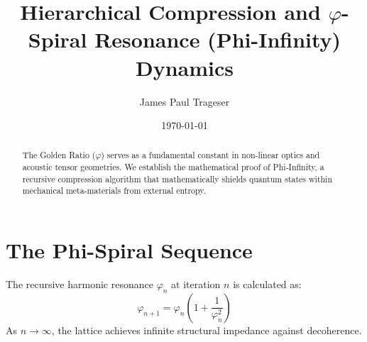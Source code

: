 \documentclass[reprint,aps,prl,twocolumn,superscriptaddress,amsmath,amssymb]{revtex4-2}
\begin{document}
\title{Hierarchical Compression and $\varphi$-Spiral Resonance (Phi-Infinity) Dynamics}

\author{James Paul Trageser}

\date{\today}

\begin{abstract}
The Golden Ratio ($\varphi$) serves as a fundamental constant in non-linear optics and acoustic tensor geometries. We establish the mathematical proof of Phi-Infinity, a recursive compression algorithm that mathematically shields quantum states within mechanical meta-materials from external entropy.
\end{abstract}

\maketitle

\section{The Phi-Spiral Sequence}
The recursive harmonic resonance $\varphi_{n}$ at iteration $n$ is calculated as:
\begin{equation}
    \varphi_{n+1} = \varphi_n \left( 1 + \frac{1}{\varphi_n^2} \right)
\end{equation}
As $n \to \infty$, the lattice achieves infinite structural impedance against decoherence.
\end{document}
